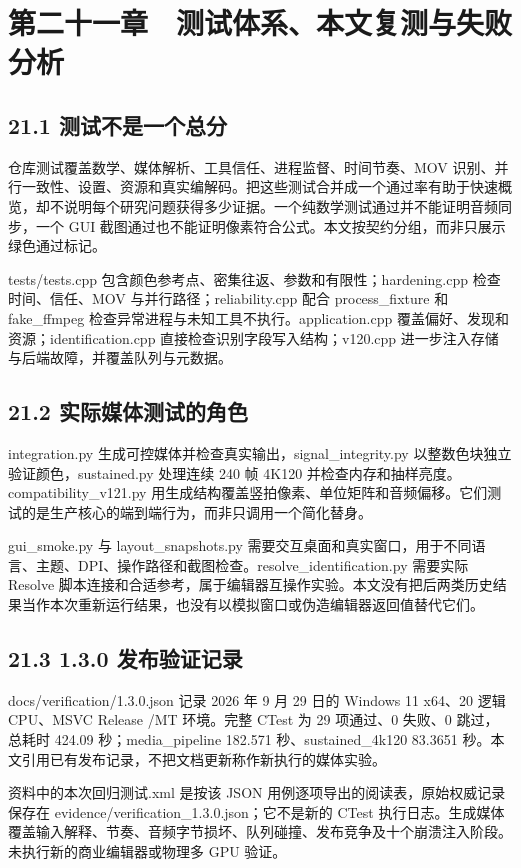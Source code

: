 \documentclass[UTF8,zihao=-4,openany]{ctexbook}
\begin{document}
\chapter*{第二十一章　测试体系、本文复测与失败分析}

\section*{21.1 测试不是一个总分}
仓库测试覆盖数学、媒体解析、工具信任、进程监督、时间节奏、MOV 识别、并行一致性、设置、资源和真实编解码。把这些测试合并成一个通过率有助于快速概览，却不说明每个研究问题获得多少证据。一个纯数学测试通过并不能证明音频同步，一个 GUI 截图通过也不能证明像素符合公式。本文按契约分组，而非只展示绿色通过标记。

tests/tests.cpp 包含颜色参考点、密集往返、参数和有限性；hardening.cpp 检查时间、信任、MOV 与并行路径；reliability.cpp 配合 process\_fixture 和 fake\_ffmpeg 检查异常进程与未知工具不执行。application.cpp 覆盖偏好、发现和资源；identification.cpp 直接检查识别字段写入结构；v120.cpp 进一步注入存储与后端故障，并覆盖队列与元数据。


\section*{21.2 实际媒体测试的角色}
integration.py 生成可控媒体并检查真实输出，signal\_integrity.py 以整数色块独立验证颜色，sustained.py 处理连续 240 帧 4K120 并检查内存和抽样亮度。compatibility\_v121.py 用生成结构覆盖竖拍像素、单位矩阵和音频偏移。它们测试的是生产核心的端到端行为，而非只调用一个简化替身。

gui\_smoke.py 与 layout\_snapshots.py 需要交互桌面和真实窗口，用于不同语言、主题、DPI、操作路径和截图检查。resolve\_identification.py 需要实际 Resolve 脚本连接和合适参考，属于编辑器互操作实验。本文没有把后两类历史结果当作本次重新运行结果，也没有以模拟窗口或伪造编辑器返回值替代它们。


\section*{21.3 1.3.0 发布验证记录}
docs/verification/1.3.0.json 记录 2026 年 9 月 29 日的 Windows 11 x64、20 逻辑 CPU、MSVC Release /MT 环境。完整 CTest 为 29 项通过、0 失败、0 跳过，总耗时 424.09 秒；media\_pipeline 182.571 秒、sustained\_4k120 83.3651 秒。本文引用已有发布记录，不把文档更新称作新执行的媒体实验。

资料中的本次回归测试.xml 是按该 JSON 用例逐项导出的阅读表，原始权威记录保存在 evidence/verification\_1.3.0.json；它不是新的 CTest 执行日志。生成媒体覆盖输入解释、节奏、音频字节损坏、队列碰撞、发布竞争及十个崩溃注入阶段。未执行新的商业编辑器或物理多 GPU 验证。
\end{document}
